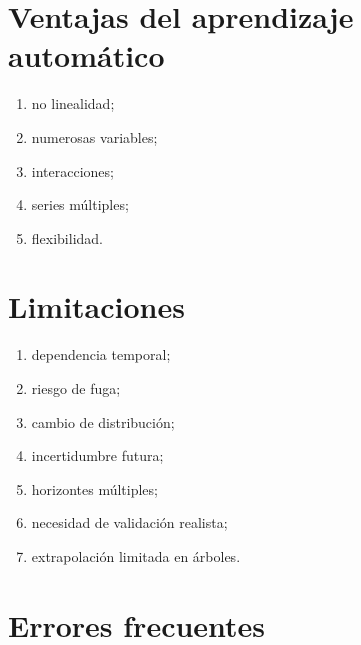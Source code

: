 \documentclass[
  spanish,
  10.5pt,
  letterpaper,
  DIV=11,
  numbers=noendperiod,
  oneside,
  open=any]{scrreprt}
\providecommand{\tightlist}{%
  \setlength{\itemsep}{0pt}\setlength{\parskip}{0pt}}
\theoremstyle{definition}
\theoremstyle{definition}
\theoremstyle{plain}
\theoremstyle{remark}
\begin{document}
\section*{Ventajas del aprendizaje
automático}\label{ventajas-del-aprendizaje-automuxe1tico}


\begin{enumerate}
\def\labelenumi{\arabic{enumi}.}
\tightlist
\item
  no linealidad;
\item
  numerosas variables;
\item
  interacciones;
\item
  series múltiples;
\item
  flexibilidad.
\end{enumerate}

\section*{Limitaciones}\label{limitaciones-8}


\begin{enumerate}
\def\labelenumi{\arabic{enumi}.}
\tightlist
\item
  dependencia temporal;
\item
  riesgo de fuga;
\item
  cambio de distribución;
\item
  incertidumbre futura;
\item
  horizontes múltiples;
\item
  necesidad de validación realista;
\item
  extrapolación limitada en árboles.
\end{enumerate}

\section*{Errores frecuentes}\label{errores-frecuentes-19}

\end{document}
